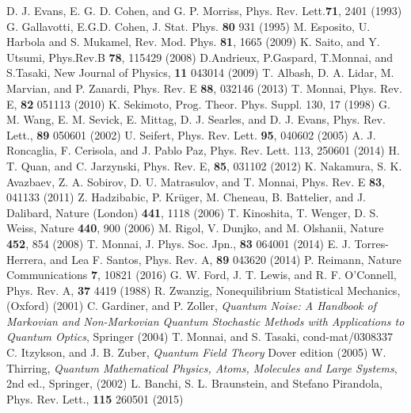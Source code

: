 \documentclass[aps,pre,twocolumn,eqsecnum,showpacs,superscriptaddress]{revtex4}
\begin{document}
\begin{thebibliography}{30}
D. J. Evans, E. G. D. Cohen, and G. P. Morriss, Phys. Rev. Lett.{\bf 71}, 2401 (1993) 
G. Gallavotti, E.G.D. Cohen, J. Stat. Phys. {\bf 80} 931 (1995)
M. Esposito, U. Harbola and S. Mukamel, Rev. Mod. Phys. {\bf 81}, 1665 (2009)
K. Saito, and Y. Utsumi, Phys.Rev.B {\bf 78}, 115429 (2008) 
D.Andrieux, P.Gaspard, T.Monnai, and S.Tasaki, New Journal of Physics, {\bf 11} 043014 (2009)
T. Albash, D. A. Lidar, M. Marvian, and P. Zanardi, Phys. Rev. E {\bf 88}, 032146 (2013)
T. Monnai, Phys. Rev. E, {\bf 82} 051113 (2010)
K. Sekimoto, Prog. Theor. Phys. Suppl. 130, 17 (1998)
G. M. Wang, E. M. Sevick, E. Mittag, D. J. Searles, and D. J. Evans, Phys. Rev. Lett., {\bf  89} 050601 (2002)
U. Seifert, Phys. Rev. Lett. {\bf 95}, 040602 (2005)
A. J. Roncaglia, F. Cerisola, and J. Pablo Paz, Phys. Rev. Lett. 113, 250601 (2014)
H. T. Quan, and C. Jarzynski, Phys. Rev. E, {\bf 85}, 031102 (2012) 
K. Nakamura, S. K. Avazbaev, Z. A. Sobirov, D. U. Matrasulov, and T. Monnai, Phys. Rev. E {\bf 83}, 041133 (2011)
Z.
  Hadzibabic, P. Kr\"uger, M. Cheneau, B. Battelier, and J. Dalibard, Nature
  (London) \textbf{441}, 1118 (2006)
T. Kinoshita, T. Wenger, D. S. Weiss, Nature {\bf 440}, 900 (2006)
M. Rigol, V. Dunjko,
  and M. Olshanii, Nature \textbf{452}, 854 (2008)
T. Monnai, J. Phys. Soc. Jpn., {\bf 83}  064001 (2014)
E. J. Torres-Herrera, and Lea F. Santos, Phys. Rev. A, {\bf 89} 043620 (2014) 
P. Reimann, Nature Communications {\bf 7}, 10821 (2016)
G. W. Ford, J. T. Lewis, and R. F. O'Connell, Phys. Rev. A, {\bf 37} 4419 (1988)
R. Zwanzig, {\rm Nonequilibrium Statistical Mechanics}, (Oxford) (2001)
C. Gardiner, and P. Zoller, {\em Quantum Noise: A Handbook of Markovian and Non-Markovian Quantum Stochastic Methods with Applications to Quantum Optics}, Springer (2004)
T. Monnai, and S. Tasaki, cond-mat/0308337
C. Itzykson, and J. B. Zuber, {\em Quantum Field Theory} Dover edition (2005)
W. Thirring, {\em Quantum Mathematical Physics, Atoms, Molecules and Large Systems}, 2nd ed., Springer, (2002)
L. Banchi, S. L. Braunstein, and Stefano Pirandola, Phys. Rev. Lett., {\bf 115} 260501 (2015)
\end{thebibliography}
\end{document}
